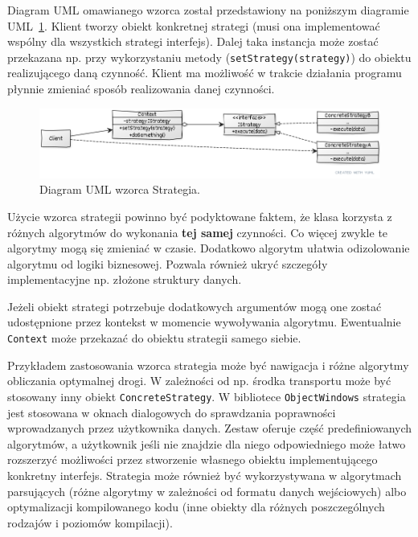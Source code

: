 Diagram UML omawianego wzorca został przedstawiony na poniższym diagramie UML~\ref{lab4/fig/StrategyUml}. Klient tworzy obiekt konkretnej strategi (musi ona implementować wspólny dla wszystkich strategi interfejs). Dalej taka instancja może zostać przekazana np. przy wykorzystaniu metody (\texttt{setStrategy(strategy)}) do obiektu realizującego daną czynność. Klient ma możliwość w trakcie działania programu płynnie zmieniać sposób realizowania danej czynności.

\begin{figure}[hbt!]
	\centering
	\includegraphics[width=0.9\linewidth]{images/StrategyUml}
	\caption{Diagram UML wzorca Strategia.}
	\label{lab4/fig/StrategyUml}
\end{figure}
%

Użycie wzorca strategii powinno być podyktowane faktem, że klasa korzysta z różnych algorytmów do wykonania \textbf{tej samej} czynności. Co więcej zwykle te algorytmy mogą się zmieniać w czasie. Dodatkowo algorytm ułatwia odizolowanie algorytmu od logiki biznesowej. Pozwala również ukryć szczegóły implementacyjne np. złożone struktury danych. 

Jeżeli obiekt strategi potrzebuje dodatkowych argumentów mogą one zostać udostępnione przez kontekst w momencie wywoływania algorytmu. Ewentualnie \texttt{Context} może przekazać do obiektu strategii samego siebie.

Przykładem zastosowania wzorca strategia może być nawigacja i różne algorytmy obliczania optymalnej drogi. W zależności od np. środka transportu może być stosowany inny obiekt \texttt{ConcreteStrategy}. W bibliotece \texttt{ObjectWindows} strategia jest stosowana w oknach dialogowych do sprawdzania poprawności wprowadzanych przez użytkownika danych. Zestaw oferuje część predefiniowanych algorytmów, a użytkownik jeśli nie znajdzie dla niego odpowiedniego może łatwo rozszerzyć możliwości przez stworzenie własnego obiektu implementującego konkretny interfejs. Strategia może również być wykorzystywana w algorytmach parsujących (różne algorytmy w zależności od formatu danych wejściowych) albo optymalizacji kompilowanego kodu (inne obiekty dla różnych poszczególnych rodzajów i poziomów kompilacji).


